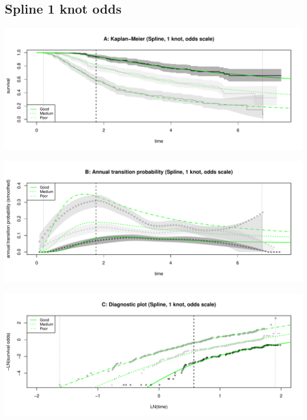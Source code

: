 \documentclass[]{article}
\begin{document}
\newpage 

\subsection{Spline 1 knot odds}\label{spline-1-knot-odds}

\begin{flushleft}\includegraphics[height=0.25\textheight]{Images/spline_odds1-1} \end{flushleft}

\begin{flushleft}\includegraphics[height=0.25\textheight]{Images/spline_odds1-2} \end{flushleft}

\begin{flushleft}\includegraphics[height=0.25\textheight]{Images/spline_odds1-3} \end{flushleft}

\newpage 
\end{document}
